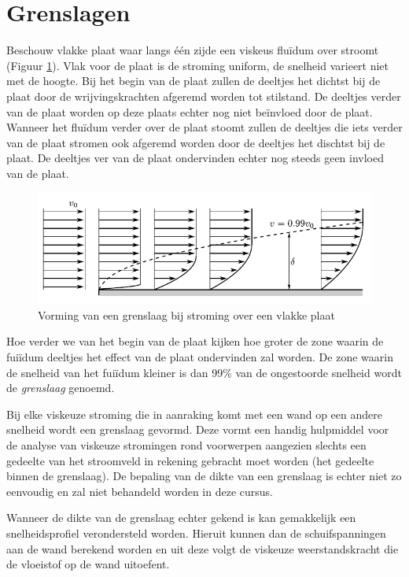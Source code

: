 	\section{Grenslagen}
	\label{sec:Grenslagen}
Beschouw vlakke plaat waar langs één zijde een viskeus fluïdum over stroomt (Figuur \ref{fig:Laminaire grenslaag}). Vlak voor de plaat is de stroming uniform, de snelheid varieert niet met de hoogte. Bij het begin van de plaat zullen de deeltjes het dichtst bij de plaat door de wrijvingskrachten afgeremd worden tot stilstand. De deeltjes verder van de plaat worden op deze plaats echter nog niet beïnvloed door de plaat. Wanneer het fluïdum verder over de plaat stoomt zullen de deeltjes die iets verder van de plaat stromen ook afgeremd worden door de deeltjes het dischtst bij de plaat. De deeltjes ver van de plaat ondervinden echter nog steeds geen invloed van de plaat.
\begin{figure}[htb]
	\centering
	\includegraphics{fig/uitwendige_stroming/Laminaire_grenslaag}
	\caption{Vorming van een grenslaag bij stroming over een vlakke plaat}
	\label{fig:Laminaire grenslaag}
\end{figure}

Hoe verder we van het begin van de plaat kijken hoe groter de zone waarin de fuiïdum deeltjes het effect van de plaat ondervinden zal worden. De zone waarin de snelheid van het fuiïdum kleiner is dan 99\% van de ongestoorde snelheid wordt de \emph{grenslaag} genoemd.

Bij elke viskeuze stroming die in aanraking komt met een wand op een andere snelheid wordt een grenslaag gevormd. Deze vormt een handig hulpmiddel voor de analyse van viskeuze stromingen rond voorwerpen aangezien slechts een gedeelte van het stroomveld in rekening gebracht moet worden (het gedeelte binnen de grenslaag). De bepaling van de dikte van een grenslaag is echter niet zo eenvoudig en zal niet behandeld worden in deze cursus.

Wanneer de dikte van de grenslaag echter gekend is kan gemakkelijk een snelheidsprofiel verondersteld worden. Hieruit kunnen dan de schuifspanningen aan de wand berekend worden en uit deze volgt de viskeuze weerstandskracht die de vloeistof op de wand uitoefent.


